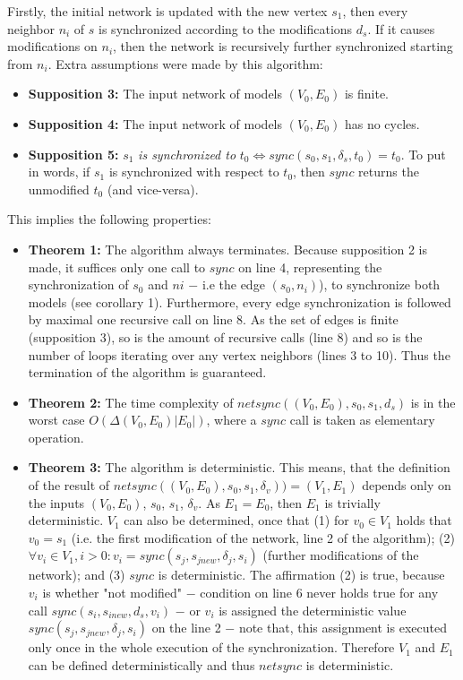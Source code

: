 \documentclass[tuberlin,cic,tc,english,noabntcite]{iiufrgs}
\begin{document}
Firstly, the initial network is updated with the new vertex $s_1$, then every neighbor $n_i$ of $s$ is synchronized according to the modifications $d_s$. If it causes modifications on $n_i$, then the network is recursively further synchronized starting from $n_i$. Extra assumptions were made by this algorithm:

\begin{itemize}
\item \textbf{Supposition 3:} The input network of models $(V_0,E_0)$ is finite.

\item \textbf{Supposition 4:} The input network of models $(V_0,E_0)$ has no cycles.

\item \textbf{Supposition 5:} $s_1$  \emph{is synchronized to}  $t_0 \Leftrightarrow sync(s_0, s_1, \delta_s, t_0) = t_0 $. To put in words, if $s_1$ is synchronized with respect to $t_0$, then $sync$ returns the unmodified $t_0$ (and vice-versa).
\end{itemize}

This implies the following properties:

\begin{itemize}
\item \textbf{Theorem 1:} The algorithm always terminates. Because supposition 2 is made, it suffices only one call to $sync$ on line 4, representing the synchronization of $s_0$ and $ni$ $-$ i.e the edge $(s_0,n_i)$), to synchronize both models (see corollary 1). Furthermore, every edge synchronization is followed by maximal one recursive call on line 8. As the set of edges is finite (supposition 3), so is the amount of recursive calls (line 8) and so is the number of loops iterating over any vertex neighbors (lines 3 to 10). Thus the termination of the algorithm is guaranteed.

\item \textbf{Theorem 2:} The time complexity of $netsync((V_0,E_0), s_0, s_1, d_s)$ is in the worst case $O(\Delta(V_0,E_0) |E_0|)$, where a $sync$ call is taken as elementary operation.

\item \textbf{Theorem 3:} The algorithm is deterministic. This means, that the definition of the result of $netsync((V_0,E_0), s_0, s_1, \delta_v)) = (V_1,E_1)$ depends only on the inputs $(V_0,E_0)$, $s_0$, $s_1$, $\delta_v$. As $E_1 = E_0$, then $E_1$ is trivially deterministic. $V_1$ can also be determined, once that (1) for $v_0 \in V_1$ holds that $v_0 = s_1$ (i.e. the first modification of the network, line 2 of the algorithm); (2) $\forall v_i \in V_1, i > 0: v_i = sync(s_j, s_{jnew}, \delta_j, s_i)$ (further modifications of the network); and (3) $sync$ is deterministic. The affirmation (2) is true, because $v_i$ is whether "not modified" $-$ condition on line 6 never holds true for any call $sync(s_i, s_{inew}, d_s, v_i)$ $-$ or $v_i$ is assigned the deterministic value $sync(s_j, s_{jnew}, \delta_j, s_i)$ on the line 2 $-$ note that, this assignment is executed only once in the whole execution of the synchronization. Therefore $V_1$ and $E_1$ can be defined deterministically and thus $netsync$ is deterministic.
\end{itemize} 
\end{document}
